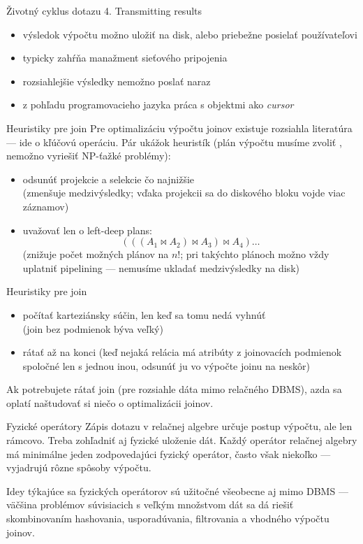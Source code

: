 \documentclass[12pt]{beamer}
\DeclareMathOperator{\join}{\bowtie}
\begin{document}
\begin{frame}[fragile]{Životný cyklus dotazu}
4. Transmitting results
\begin{itemize}
  \item výsledok výpočtu možno uložiť na disk, alebo priebežne posielať používateľovi
  \item typicky zahŕňa manažment sieťového pripojenia
  \item rozsiahlejšie výsledky nemožno poslať naraz
  \item z pohľadu programovacieho jazyka práca s objektmi ako \emph{cursor}
\end{itemize}
\end{frame}

\begin{frame}[fragile]{Heuristiky pre join}
Pre optimalizáciu výpočtu joinov existuje rozsiahla literatúra --- ide o kľúčovú operáciu.
Pár ukážok heuristík (plán výpočtu musíme zvoliť , nemožno vyriešiť NP-ťažké problémy):
\begin{itemize}
  \item odsunúť projekcie a selekcie čo najnižšie\\(zmenšuje medzivýsledky; vďaka projekcii sa do diskového bloku vojde viac záznamov)
  \item uvažovať len o left-deep plans:
    $$(((A_1\join A_2)\join A_3)\join A_4)\dots$$
    (znižuje počet možných plánov na $n!$; pri takýchto plánoch možno vždy uplatniť pipelining --- nemusíme ukladať medzivýsledky na disk)
\end{itemize}
\end{frame}

\begin{frame}[fragile]{Heuristiky pre join}
\begin{itemize}
  \item počítať karteziánsky súčin, len keď sa tomu nedá vyhnúť\\
    (join bez podmienok býva veľký)
  \item {} rátať až na konci (keď nejaká relácia má atribúty z joinovacích podmienok spoločné len s jednou inou, odsunúť ju vo výpočte joinu na neskôr)
\end{itemize}
Ak potrebujete rátať join  (pre rozsiahle dáta mimo relačného DBMS), azda sa oplatí naštudovať si niečo o optimalizácii joinov.
\end{frame}


\begin{frame}[fragile]{Fyzické operátory}
Zápis dotazu v relačnej algebre určuje postup výpočtu, ale len rámcovo.
Treba zohľadniť aj fyzické uloženie dát.
Každý operátor relačnej algebry má minimálne jeden zodpovedajúci fyzický operátor,
často však niekoľko --- vyjadrujú rôzne spôsoby výpočtu.
\bigskip

Idey týkajúce sa fyzických operátorov sú užitočné všeobecne aj mimo DBMS
--- väčšina problémov súvisiacich s veľkým množstvom dát sa dá riešiť
skombinovaním hashovania, usporadúvania, filtrovania a vhodného výpočtu joinov.
\end{frame}
\end{document}

